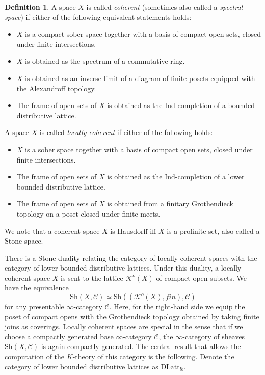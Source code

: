 \documentclass[10pt]{amsart}
\theoremstyle{definition}
\newtheorem{definition}[theorem]{Definition}
\begin{document}
\begin{definition}
A space $X$ is called \emph{coherent} (sometimes also called a \emph{spectral space}) if either of the following equivalent statements holds:
\begin{itemize}
\item $X$ is a compact sober space together with a basis of compact open sets, closed under finite intersections.
\item $X$ is obtained as the spectrum of a commutative ring.
\item $X$ is obtained as an inverse limit of a diagram of finite posets equipped with the Alexandroff topology.
\item The frame of open sets of $X$ is obtained as the Ind-completion of a bounded distributive lattice.
\end{itemize}
A space $X$ is called \emph{locally coherent} if either of the following holds:
\begin{itemize}
\item $X$ is a sober space together with a basis of compact open sets, closed under finite intersections.
\item The frame of open sets of $X$ is obtained as the Ind-completion of a lower bounded distributive lattice.
\item The frame of open sets of $X$ is obtained from a finitary Grothendieck topology on a poset closed under finite meets.
\end{itemize}
\end{definition}
\noindent We note that a coherent space $X$ is Hausdorff iff $X$ is a profinite set, also called a Stone space.

There is a Stone duality relating the category of locally coherent spaces with the category of lower bounded distributive lattices. Under this duality, a locally coherent space $X$ is sent to the lattice $\mathcal{K}^o(X)$ of compact open subsets. We have the equivalence
$$ \mathrm{Sh}(X,\mathcal{C}) \simeq  \mathrm{Sh}((\mathcal{K}^o(X),fin),\mathcal{C}) $$
for any presentable $\infty$-category $\mathcal{C}$. Here, for the right-hand side we equip the poset of compact opens with the Grothendieck topology obtained by taking finite joins as coverings. Locally coherent spaces are special in the sense that if we choose a compactly generated base $\infty$-category $\mathcal{C}$, the $\infty$-category of sheaves $\mathrm{Sh}(X,\mathcal{C})$ is again compactly generated. The central result that allows the computation of the $K$-theory of this category is the following. Denote the category of lower bounded distributive lattices as $\mathrm{DLatt}_{lb}$.
\end{document}

